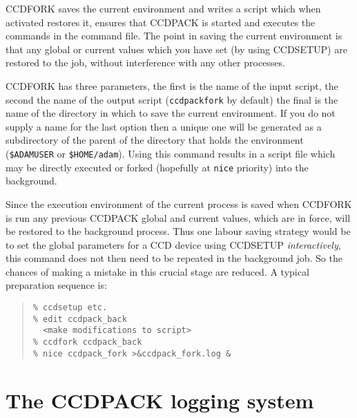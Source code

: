 \documentclass[twoside,11pt]{article}
\newcommand{\htmlref}[2]{#1}
\newcommand{\xlabel}[1]{}
\renewcommand{\_}{\texttt{\symbol{95}}}
\newenvironment{myquote}{\begin{quote}\begin{small}}{\end{small}\end{quote}}
\newcommand{\text}[1]{{\small \tt #1}}
\newcommand{\routine}[1]{{\sc #1}}
\newcommand{\xroutine}[1]{\htmlref{{\sc #1}}{#1}}
\begin{document}
\routine{CCDFORK} saves the current environment and writes a script which
when activated restores it, ensures that CCDPACK is
started and executes the commands in the command file. The point in
saving the current environment is that any global or current values
which you have set (by using \xroutine{CCDSETUP}) are restored to the job,
without interference with any other processes.

\routine{CCDFORK} has three parameters, the first is the name of the input
script, the second the name of the output script (\text{ccdpack\_fork} by
default) the final is the name of the directory in which to save the
current environment. If you do not supply a name for the last option
then a unique one will be generated as a subdirectory of the parent of
the directory that holds the environment (\text{\$ADAM\_USER} or
\text{\$HOME/adam}). Using this command results in a script file which may be
directly executed or forked (hopefully at \text{nice} priority) into
the background.

Since the execution environment of the current process is saved
when \routine{CCDFORK} is run any previous CCDPACK global and current values,
which are in force, will be restored to the background process. Thus
one labour saving strategy would be to set the global parameters for a
CCD device using \routine{CCDSETUP} {\em interactively}, this command does not
then need to be repeated in the background job.  So the chances
of making a mistake in this crucial stage are reduced. A typical
preparation sequence is:
\begin{myquote}
\begin{verbatim}
% ccdsetup etc.
% edit ccdpack_back
  <make modifications to script>
% ccdfork ccdpack_back
% nice ccdpack_fork >&ccdpack_fork.log &
\end{verbatim}
\end{myquote}

\section{The CCDPACK logging system \xlabel{logsystem} \label{logsystem}}
\end{document}
